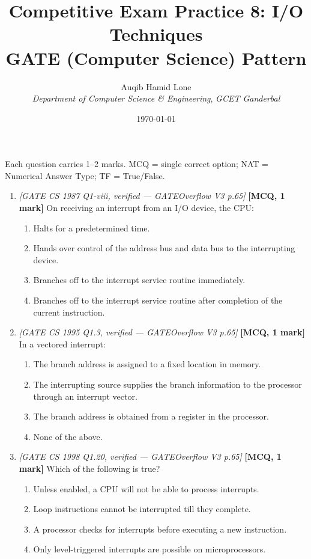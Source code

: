 \documentclass[11pt]{article}
\title{Competitive Exam Practice 8: I/O Techniques\\\large GATE (Computer Science) Pattern}
\author{Auqib Hamid Lone\\[0.3em]
  \emph{Department of Computer Science \& Engineering}, \emph{GCET Ganderbal}}
\date{\today}
\begin{document}
\maketitle

\noindent Each question carries 1--2 marks. MCQ = single correct option; NAT = Numerical Answer Type; TF = True/False.

\begin{enumerate}
\item[\textbf{Q1}] \textit{[GATE CS 1987 Q1-viii, verified --- GATEOverflow V3 p.65]} \textbf{[MCQ, 1 mark]} On receiving an interrupt from an I/O device, the CPU:
\begin{enumerate}
  \item[(A)] Halts for a predetermined time.
  \item[(B)] Hands over control of the address bus and data bus to the interrupting device.
  \item[(C)] Branches off to the interrupt service routine immediately.
  \item[(D)] Branches off to the interrupt service routine after completion of the current instruction.
\end{enumerate}

\item[\textbf{Q2}] \textit{[GATE CS 1995 Q1.3, verified --- GATEOverflow V3 p.65]} \textbf{[MCQ, 1 mark]} In a vectored interrupt:
\begin{enumerate}
  \item[(A)] The branch address is assigned to a fixed location in memory.
  \item[(B)] The interrupting source supplies the branch information to the processor through an interrupt vector.
  \item[(C)] The branch address is obtained from a register in the processor.
  \item[(D)] None of the above.
\end{enumerate}

\item[\textbf{Q3}] \textit{[GATE CS 1998 Q1.20, verified --- GATEOverflow V3 p.65]} \textbf{[MCQ, 1 mark]} Which of the following is true?
\begin{enumerate}
  \item[(A)] Unless enabled, a CPU will not be able to process interrupts.
  \item[(B)] Loop instructions cannot be interrupted till they complete.
  \item[(C)] A processor checks for interrupts before executing a new instruction.
  \item[(D)] Only level-triggered interrupts are possible on microprocessors.
\end{enumerate}


\end{enumerate}
\end{document}
